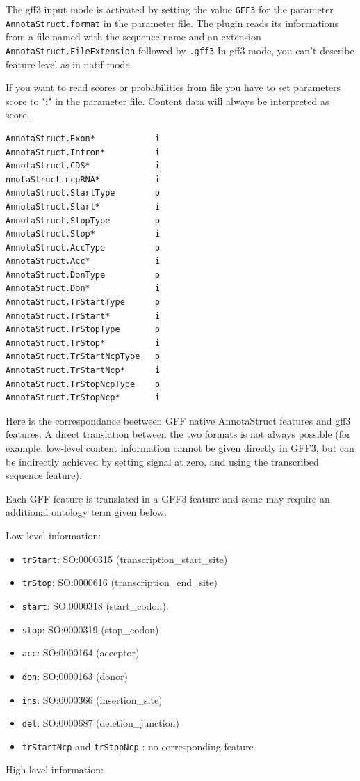 The gff3 input mode is activated by setting the value \texttt{GFF3}
for the parameter \texttt{AnnotaStruct.format} in the parameter file.
The plugin reads its informations from a file named with the sequence
name and an extension \texttt{AnnotaStruct.FileExtension} followed by
\texttt{.gff3} In gff3 mode, you can't describe feature level as in
natif mode.

If you want to read scores or probabilities from file you have to set
parameters score to "i" in the parameter file.  Content data will
always be interpreted as score.
\begin{Verbatim}[fontsize=\small]
AnnotaStruct.Exon*            i
AnnotaStruct.Intron*          i
AnnotaStruct.CDS*             i
nnotaStruct.ncpRNA*           i
AnnotaStruct.StartType        p 
AnnotaStruct.Start*           i
AnnotaStruct.StopType         p 
AnnotaStruct.Stop*            i
AnnotaStruct.AccType          p 
AnnotaStruct.Acc*             i
AnnotaStruct.DonType          p 
AnnotaStruct.Don*             i
AnnotaStruct.TrStartType      p 
AnnotaStruct.TrStart*         i
AnnotaStruct.TrStopType       p 
AnnotaStruct.TrStop*          i
AnnotaStruct.TrStartNcpType   p
AnnotaStruct.TrStartNcp*      i
AnnotaStruct.TrStopNcpType    p  
AnnotaStruct.TrStopNcp*       i
\end{Verbatim}

Here is the correspondance beetween GFF native AnnotaStruct features
and gff3 features. A direct translation between the two formats is not
always possible (for example, low-level content information cannot be
given directly in GFF3, but can be indirectly achieved by setting
signal at zero, and using the transcribed sequence feature).

Each GFF feature is translated in a GFF3 feature and some may
require an additional ontology term given below.

Low-level information:
\begin{itemize}
\item \texttt{trStart}: 	SO:0000315 (transcription\_start\_site)
\item \texttt{trStop}: 	SO:0000616 (transcription\_end\_site)
\item \texttt{start}: 	SO:0000318 (start\_codon).
\item \texttt{stop}: 	SO:0000319 (stop\_codon)
\item \texttt{acc}: 	SO:0000164 (acceptor)
\item \texttt{don}: 	SO:0000163 (donor)
\item \texttt{ins}: 	SO:0000366 (insertion\_site)
\item \texttt{del}: 	SO:0000687 (deletion\_junction)
\item \texttt{trStartNcp} and \texttt{trStopNcp} : no corresponding feature
\end{itemize}
High-level information:

